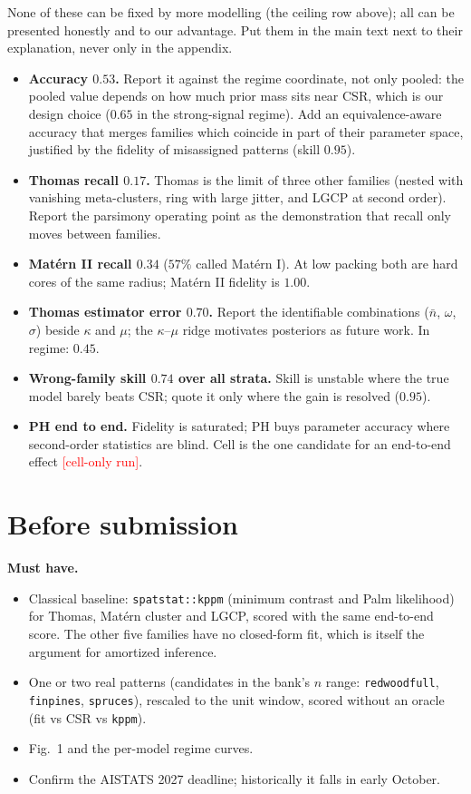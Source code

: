 \documentclass[11pt]{article}
\newcommand{\nb}{\bar n}
\newcommand{\pending}[1]{\textcolor{red}{[#1]}}
\begin{document}
None of these can be fixed by more modelling (the ceiling row above); all can be presented honestly and to our
advantage. Put them in the main text next to their explanation, never only in the appendix.
\begin{itemize}
  \item \textbf{Accuracy $0.53$.} Report it against the regime coordinate, not only pooled: the pooled value depends
    on how much prior mass sits near CSR, which is our design choice ($0.65$ in the strong-signal regime). Add an
    equivalence-aware accuracy that merges families which coincide in part of their parameter space, justified by the
    fidelity of misassigned patterns (skill $0.95$).
  \item \textbf{Thomas recall $0.17$.} Thomas is the limit of three other families (nested with vanishing
    meta-clusters, ring with large jitter, and LGCP at second order). Report the parsimony operating point as the
    demonstration that recall only moves between families.
  \item \textbf{Mat\'ern II recall $0.34$} ($57\%$ called Mat\'ern I). At low packing both are hard cores of the same
    radius; Mat\'ern II fidelity is $1.00$.
  \item \textbf{Thomas estimator error $0.70$.} Report the identifiable combinations ($\nb$, $\omega$, $\sigma$) beside
    $\kappa$ and $\mu$; the $\kappa$--$\mu$ ridge motivates posteriors as future work. In regime: $0.45$.
  \item \textbf{Wrong-family skill $0.74$ over all strata.} Skill is unstable where the true model barely beats CSR;
    quote it only where the gain is resolved ($0.95$).
  \item \textbf{PH end to end.} Fidelity is saturated; PH buys parameter accuracy where second-order statistics are
    blind. Cell is the one candidate for an end-to-end effect \pending{cell-only run}.
\end{itemize}

\section*{Before submission}

\textbf{Must have.}
\begin{itemize}
  \item Classical baseline: \texttt{spatstat::kppm} (minimum contrast and Palm likelihood) for Thomas, Mat\'ern cluster and
    LGCP, scored with the same end-to-end score. The other five families have no closed-form fit, which is itself the
    argument for amortized inference.
  \item One or two real patterns (candidates in the bank's $n$ range: \texttt{redwoodfull}, \texttt{finpines},
    \texttt{spruces}), rescaled to the unit window, scored without an oracle (fit vs CSR vs \texttt{kppm}).
  \item Fig.~1 and the per-model regime curves.
  \item Confirm the AISTATS 2027 deadline; historically it falls in early October.
\end{itemize}
\end{document}

